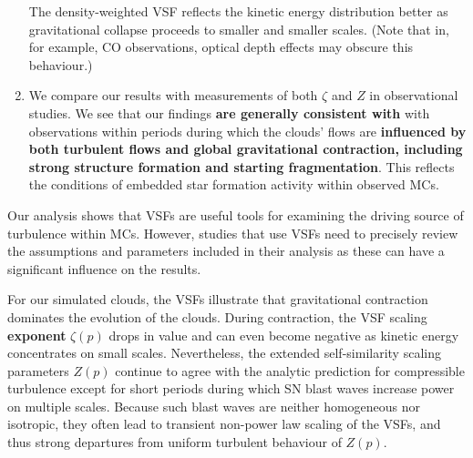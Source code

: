 \begin{enumerate}
	The density-weighted VSF reflects the kinetic energy distribution better as gravitational collapse proceeds to smaller and smaller scales. 
	(Note that in, for example, CO observations, optical depth effects may obscure this behaviour.) 
	\item We compare our results with measurements of both $\zeta$ and $Z$ in observational studies. 
	We see that our findings \textbf{are generally consistent with} with observations within periods during which the clouds' flows are \textbf{influenced by both turbulent flows and global gravitational contraction, including strong structure formation and starting fragmentation}. This reflects the conditions of embedded star formation activity within observed MCs.
\end{enumerate}

Our analysis shows that VSFs are useful tools for examining the driving source of turbulence within MCs.
However, studies that use VSFs need to precisely review the assumptions and parameters included in their analysis as these can have a significant influence on the results.

For our simulated clouds, the VSFs illustrate that gravitational contraction dominates the evolution of the clouds.
During contraction, the VSF scaling \textbf{exponent} $\zeta(p)$ drops in value and can even become negative as kinetic energy concentrates on small scales.
Nevertheless, the extended self-similarity scaling parameters $Z(p)$ continue to agree with the analytic prediction for compressible turbulence except for short periods during which SN blast waves increase power on multiple scales.
Because such blast waves are neither homogeneous nor isotropic, they often lead to transient non-power law scaling of the VSFs, and thus strong departures from uniform turbulent behaviour of $Z(p)$.


\endinput
